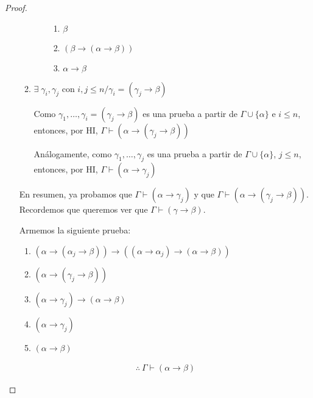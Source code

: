 \begin{proof}
\begin{itemize}
\begin{enumerate}
\begin{itemize}
                            \begin{enumerate}
                                \item $\beta$ %
                                \item $(\beta\to(\alpha\to\beta))$
                                \item $\alpha\to\beta$
                            \end{enumerate}
                    \end{itemize}

                \item $\exists \; \gamma_i, \gamma_j \text{ con } i,j\leq n /
                    \gamma_i = (\gamma_j \to \beta)$

                    Como $\gamma_1, \dotsc, \gamma_i = (\gamma_j\to\beta)$
                    es una prueba a partir de $\Gamma \cup \{ \alpha \}$
                    e $i \leq n$, entonces, por HI, 
                    $\Gamma\vdash(\alpha\to(\gamma_j\to\beta))$

                    Análogamente, como $\gamma_1, \dotsc, \gamma_j$ es una
                    prueba a partir de $\Gamma\cup \{ \alpha \}$, $j \leq n$,
                    entonces, por HI, $\Gamma \vdash(\alpha\to\gamma_j)$
            \end{enumerate}

            En resumen, ya probamos que $\Gamma \vdash (\alpha\to\gamma_j)$ y
            que $\Gamma\vdash(\alpha\to(\gamma_j\to\beta))$.
            Recordemos que queremos ver que $\Gamma\vdash(\gamma\to\beta)$.

            Armemos la siguiente prueba:

            \begin{enumerate}
                \item $(\alpha\to(\alpha_j\to\beta)) \to 
                    ((\alpha\to\alpha_j) \to (\alpha\to\beta))$
                \item $(\alpha \to (\gamma_j\to\beta))$
                \item $(\alpha \to \gamma_j)\to(\alpha\to\beta)$
                \item $(\alpha\to\gamma_j)$
                \item $(\alpha\to\beta)$ %
            \end{enumerate}

            \begin{gather*}
                \therefore ~ \Gamma \vdash (\alpha \to \beta)
            \end{gather*}
    \end{itemize}
\end{proof}


